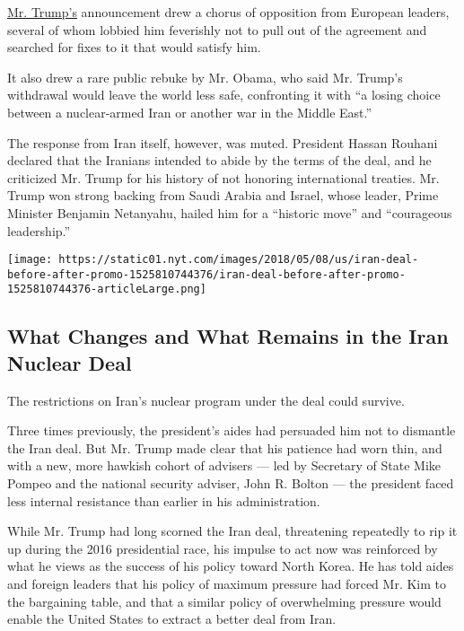 \href{https://www.nytimes.com/2019/04/08/world/middleeast/trump-iran-revolutionary-guard-corps.html}{Mr.
Trump's} announcement drew a chorus of opposition from European leaders,
several of whom lobbied him feverishly not to pull out of the agreement
and searched for fixes to it that would satisfy him.

It also drew a rare public rebuke by Mr. Obama, who said Mr. Trump's
withdrawal would leave the world less safe, confronting it with ``a
losing choice between a nuclear-armed Iran or another war in the Middle
East.''

The response from Iran itself, however, was muted. President Hassan
Rouhani declared that the Iranians intended to abide by the terms of the
deal, and he criticized Mr. Trump for his history of not honoring
international treaties. Mr. Trump won strong backing from Saudi Arabia
and Israel, whose leader, Prime Minister Benjamin Netanyahu, hailed him
for a ``historic move'' and ``courageous leadership.''

\href{https://www.nytimes.com/interactive/2018/05/07/world/middleeast/iran-deal-before-after.html}{}

\texttt{[image: https://static01.nyt.com/images/2018/05/08/us/iran-deal-before-after-promo-1525810744376/iran-deal-before-after-promo-1525810744376-articleLarge.png]}

\hypertarget{what-changes-and-what-remains-in-the-iran-nuclear-deal}{%
\subsection{What Changes and What Remains in the Iran Nuclear
Deal}\label{what-changes-and-what-remains-in-the-iran-nuclear-deal}}

The restrictions on Iran's nuclear program under the deal could survive.

Three times previously, the president's aides had persuaded him not to
dismantle the Iran deal. But Mr. Trump made clear that his patience had
worn thin, and with a new, more hawkish cohort of advisers --- led by
Secretary of State Mike Pompeo and the national security adviser, John
R. Bolton --- the president faced less internal resistance than earlier
in his administration.

While Mr. Trump had long scorned the Iran deal, threatening repeatedly
to rip it up during the 2016 presidential race, his impulse to act now
was reinforced by what he views as the success of his policy toward
North Korea. He has told aides and foreign leaders that his policy of
maximum pressure had forced Mr. Kim to the bargaining table, and that a
similar policy of overwhelming pressure would enable the United States
to extract a better deal from Iran.


